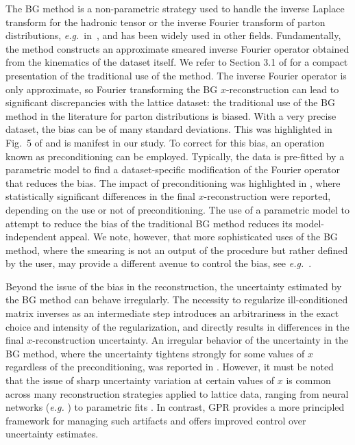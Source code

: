 \documentclass[aps,prl,groupedaddress,twocolumn,superscriptaddress,amsfonts,amssymb,amsmath,showpacs,floatfix,preprintnumbers]{revtex4-2}
\begin{document}
The BG method is a non-parametric strategy used to handle the inverse Laplace transform for the hadronic tensor \cite{Liang:2017mye, Liang:2019frk} or the inverse Fourier transform of parton distributions, \textit{e.g.}~in~\cite{Karpie:2019eiq,Bhat:2020ktg,Alexandrou:2021bbo, Bhat:2022zrw, Bhattacharya:2023nmv,Bhattacharya:2023jsc}, and has been widely used in other fields. Fundamentally, the method constructs an approximate smeared inverse Fourier operator obtained from the kinematics of the dataset itself. We refer to Section 3.1 of \cite{Karpie:2019eiq} for a compact presentation of the traditional use of the method. The inverse Fourier operator is only approximate, so Fourier transforming the BG $x$-reconstruction can lead to significant discrepancies with the lattice dataset: the traditional use of the BG method in the literature for parton distributions is biased. With a very precise dataset, the bias can be of many standard deviations. This was highlighted in Fig.~5 of \cite{Karpie:2019eiq} and is manifest in our study. To correct for this bias, an operation known as preconditioning can be employed. Typically, the data is pre-fitted by a parametric model to find a dataset-specific modification of the Fourier operator that reduces the bias. The impact of preconditioning was highlighted in \cite{Bhat:2020ktg}, where statistically significant differences in the final $x$-reconstruction were reported, depending on the use or not of preconditioning. The use of a parametric model to attempt to reduce the bias of the traditional BG method reduces its model-independent appeal. We note, however, that more sophisticated uses of the BG method, where the smearing is not an output of the procedure but rather defined by the user, may provide a different avenue to control the bias, see \textit{e.g.}~\cite{Hansen:2019idp}.

Beyond the issue of the bias in the reconstruction, the uncertainty estimated by the BG method can behave irregularly. The necessity to regularize ill-conditioned matrix inverses as an intermediate step introduces an arbitrariness in the exact choice and intensity of the regularization, and directly results in differences in the final $x$-reconstruction uncertainty. An irregular behavior of the uncertainty in the BG method, where the uncertainty tightens strongly for some values of $x$ regardless of the preconditioning, was reported in \cite{Bhat:2020ktg}. 
However, it must be noted that the issue of sharp uncertainty variation at certain values of $x$ is common across many reconstruction strategies applied to lattice data, ranging from neural networks (\textit{e.g.} \cite{Gao:2022uhg}) to parametric fits \cite{Dutrieux:2024rem}. In contrast, GPR provides a more principled framework for managing such artifacts and offers improved control over uncertainty estimates.
\end{document}
